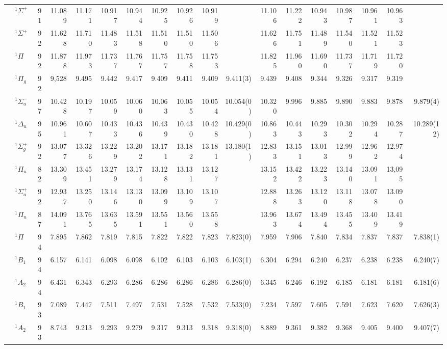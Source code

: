 \documentclass[aip,jcp,reprint,noshowkeys,superscriptaddress]{revtex4-1}
\begin{document}
\begin{squeezetable}
\begin{table}
\begin{ruledtabular}
\begin{tabular}{llrrrrrrrrrrrrrrrr}
				&	$^1\Sigma^+$ 	&91	&11.089	&11.171	&10.917	&10.944	&10.925	&10.926	&10.919	&			&11.106	&11.222	&10.943	&10.987	&10.961	&10.963	&	\\
				&	$^1\Sigma^+$ 	&92	&11.628	&11.710	&11.483	&11.518	&11.510	&11.510	&11.506	&			&11.626	&11.751	&11.489	&11.540	&11.521	&11.523	&	\\
				&	$^1\Pi$ 		&92	&11.878	&11.973	&11.737	&11.767	&11.757	&11.758	&11.753	&			&11.825	&11.960	&11.690	&11.737	&11.719	&11.720	&	\\
	\ce{N2}		&	$^1\Pi_g$  		&92	&9,528	&9.495	&9.442	&9.417	&9.409	&9.411	&9.409	&9.411(3)	&9.439	&9.408	&9.344	&9.326	&9.317	&9.319	&	\\
				&	$^1\Sigma_u^-$	&97	&10.428	&10.197	&10.059	&10.060	&10.063	&10.055	&10.054	&10.054(0)	&10.320	&9.996	&9.885	&9.890	&9.883	&9.878	&9.879(4)\\
				&	$^1\Delta_u$ 	&95	&10.961	&10.607	&10.433	&10.436	&10.439	&10.430	&10.428	&10.429(0)	&10.863	&10.443	&10.293	&10.302	&10.294	&10.287	&10.289(12)\\
				&	$^1\Sigma_g^+$	&92	&13.077	&13.326	&13.229	&13.202	&13.171	&13.182	&13.181	&13.180(1)	&12.833	&13.151	&13.013	&12.999	&12.962	&12.974	&	\\
				&	$^1\Pi_u$  		&82	&13.309	&13.451	&13.279	&13.174	&13.128	&13.131	&13.127	&			&13.152	&13.422	&13.223	&13.140	&13.091	&13,095	&	\\
				&	$^1\Sigma_u^+$	&92	&12.937	&13.250	&13.146	&13.130	&13.099	&13.109	&13.107	&			&12.888	&13.263	&13.120	&13.118	&13.078	&13.090	&	\\
				&	$^1\Pi_u$ 		&87	&14.091	&13.765	&13.635	&13.591	&13.551	&13.560	&13.558	&			&13.963	&13.674	&13.494	&13.455	&13.409	&13.419\\
	\ce{HCl}	&	$^1\Pi$ 		&94	&7.895	&7.862	&7.819	&7.815	&7.822	&7.822	&7.823	&7.823(0)	&7.959	&7.906	&7.840	&7.834	&7.837	&7.837	&7.838(1)\\
	\ce{H2S}	&	$^1B_1$  		&94	&6.157	&6.141	&6.098	&6.098	&6.102	&6.103	&6.103	&6.103(1)	&6.304	&6.294	&6.240	&6.237	&6.238	&6.238	&6.240(7)\\
				&	$^1A_2$  		&94	&6.431	&6.343	&6.293	&6.286	&6.286	&6.286	&6.286	&6.286(0)	&6.345	&6.246	&6.192	&6.185	&6.181	&6.181	&6.181(6) \\
	\ce{H2O}	&	$^1B_1$  		&93	&7.089	&7.447	&7.511	&7.497	&7.531	&7.528	&7.532	&7.533(0)	&7.234	&7.597	&7.605	&7.591	&7.623	&7.620	&7.626(3)\\
				&	$^1A_2$  		&93	&8.743	&9.213	&9.293	&9.279	&9.317	&9.313	&9.318	&9.318(0)	&8.889	&9.361	&9.382	&9.368	&9.405	&9.400	&9.407(7)\\

\end{tabular}
\end{ruledtabular}
\end{table}
\end{squeezetable}
\end{document}
